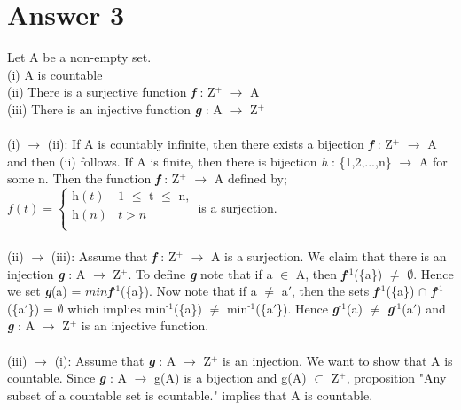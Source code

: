 \documentclass[11pt]{article}
\begin{document}
\section*{Answer 3}
Let A be a non-empty set.\\
(i) A is countable \\
(ii)  There is a surjective function \textbf{\textit{f}} : Z$^\text{+}$ $\xrightarrow{}$ A  \\
(iii) There is an injective function \textbf{\textit{g}} : A $\xrightarrow{}$ Z$^\text{+}$ \\
\\
(i) $\xrightarrow{}$ (ii): If A is countably infinite, then there exists a bijection \textbf{\textit{f}} : Z$^\text{+}$ $\xrightarrow{}$ A and then (ii) follows. If A is finite, then there is bijection \textit{h} : \{1,2,...,n\} $\xrightarrow{}$ A for some n. Then the function \textbf{\textit{f}} : Z$^\text{+}$ $\xrightarrow{}$ A defined by;\\
$\displaystyle f(t) = \begin{cases}
\textit{h}(t) & \text{1 $\leq$ t $\leq$ n,} \\ 
\textit{h}(n) & \text{$t > n$} \\ 
\end{cases}$
\hspace{0.4cm}is a surjection.\\
\vspace{0.6cm} \\
(ii) $\xrightarrow{}$ (iii): Assume that \textbf{\textit{f}} : Z$^\text{+}$ $\xrightarrow{}$ A is a surjection. We claim that there is an injection \textbf{\textit{g}} : A $\xrightarrow{}$ Z$^\text{+}$. To define \textbf{\textit{g}} note that if a $\in$ A, then \textbf{\textit{f}}$^\text{-1}$(\{a\}) $\neq$ $\emptyset$. Hence we set \textbf{\textit{g}}(a) = $\textit{min}$\textbf{\textit{f}}$^\text{-1}$(\{a\}). Now note that if a $\neq$ a$\ensuremath{'}$, then the sets \textbf{\textit{f}}$^\text{-1}$(\{a\}) $\cap$ \textbf{\textit{f}}$^\text{-1}$(\{a$\ensuremath{'}$\}) = $\emptyset$ which implies min$^\text{-1}$(\{a\}) $\neq$ min$^\text{-1}$(\{a$\ensuremath{'}$\}). Hence \textbf{\textit{g}}$^\text{-1}$(a) $\neq$ \textbf{\textit{g}}$^\text{-1}$(a$\ensuremath{'}$) and \textbf{\textit{g}} : A $\xrightarrow{}$ Z$^\text{+}$ is an injective function.\\
\vspace{0.6cm} \\
(iii) $\xrightarrow{}$ (i): Assume that \textbf{\textit{g}} : A $\xrightarrow{}$ Z$^\text{+}$ is an injection. We want to show that A is countable. Since  \textbf{\textit{g}} : A $\xrightarrow{}$ g(A) is a bijection and g(A) $\subset$ Z$^\text{+}$, proposition "Any subset of a countable set is countable." implies that A is countable.\\
\end{document}
